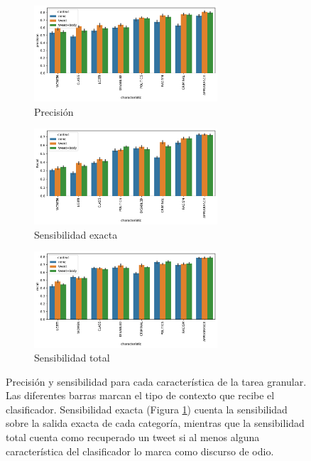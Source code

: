 \begin{figure}[ht!]
    \centering
    \small
    \begin{subfigure}[b]{\textwidth}
        \centering
        \caption{Precisión}
        \includegraphics[width=0.75\textwidth]{img/06/precision_barplot.pdf}

    \end{subfigure}
    \begin{subfigure}[b]{\textwidth}
        \centering
        \caption{Sensibilidad exacta}
        \includegraphics[width=0.75\textwidth]{img/06/exact_recall_barplot.pdf}

        \label{subfig:exact_recall}
    \end{subfigure}
    \begin{subfigure}[b]{\textwidth}
        \centering
        \caption{Sensibilidad total}
        \includegraphics[width=0.75\textwidth]{img/06/hate_recall_barplot.pdf}

        \label{subfig:total_recall}
    \end{subfigure}
    \caption{Precisión y sensibilidad para cada característica de la tarea granular. Las diferentes barras marcan el tipo de contexto que recibe el clasificador. Sensibilidad exacta (Figura \ref{subfig:exact_recall}) cuenta la sensibilidad sobre la salida exacta de cada categoría, mientras que la sensibilidad total cuenta como recuperado un tweet si al menos alguna característica del clasificador lo marca como discurso de odio.}
    \label{fig:precision_recall_granular_classifier}
\end{figure}


